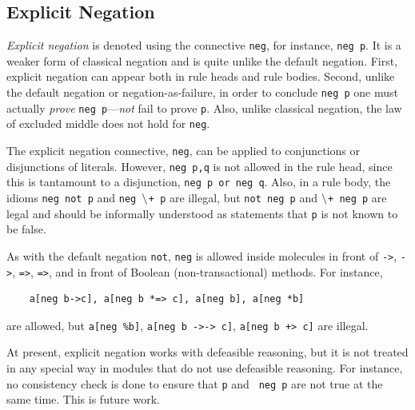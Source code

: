 \documentclass[11pt]{article}
\newcommand{\NAF}{\mbox{\tt \ensuremath{\tt\backslash}+}\xspace}
\newcommand{\TNOT}{{{\tt not}}\xspace}
\begin{document}
\subsection{Explicit Negation}
\label{sec-explicit-negation}

\emph{Explicit negation} is denoted using the connective {\tt neg}, for
instance, {\tt neg p}. It is a weaker form of classical negation and is
quite unlike the default negation. First, explicit negation can appear both
in rule heads and rule bodies. Second, unlike the default negation or
negation-as-failure, in order to conclude {\tt neg p} one must actually
\emph{prove} {\tt neg p}---\emph{not} fail to prove {\tt p}. Also, unlike
classical negation, the law of excluded middle does not hold for {\tt neg}.

The explicit negation connective, {\tt neg}, can be applied to conjunctions
or disjunctions of literals. However, {\tt neg p,q} is not allowed in the
rule head, since this is tantamount to a disjunction, {\tt neg p or neg q}.  
Also, in a rule body, the idioms {\tt neg not p} and {\tt neg \NAF p} are
illegal, but {\tt not neg p} and {\tt \NAF neg p} are legal and should be
informally understood as statements that {\tt p} is not known to be false. 

As with the default negation \TNOT, {\tt neg} is allowed inside molecules 
in front of {\tt ->}, {\tt *->}, {\tt =>}, {\tt *=>}, and in front of
Boolean (non-transactional) methods. For instance,
\begin{verbatim}
    a[neg b->c], a[neg b *=> c], a[neg b], a[neg *b]
\end{verbatim}
are allowed, but {\tt a[neg \%b]}, {\tt a[neg b ->-> c]}, {\tt a[neg b
  +> c]} are illegal.  

At present, explicit negation works with defeasible reasoning, but it is
not treated in any special way in modules that do not use defeasible reasoning.
For instance, no consistency check is done to ensure that {\tt p} and {\tt
  neg p} are not true at the same time. This is future work.
\end{document}
